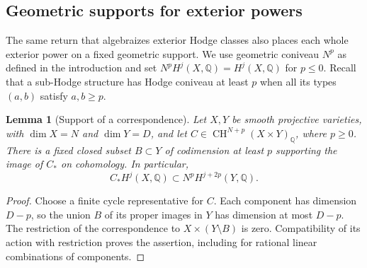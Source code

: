 \documentclass[11pt]{amsart}
\newcommand{\Q}{\mathbb Q}
\DeclareMathOperator{\CH}{CH}
\newtheorem{lemma}[theorem]{Lemma}
\theoremstyle{definition}
\theoremstyle{remark}
\numberwithin{equation}{section}
\begin{document}
\subsection{Geometric supports for exterior powers}
\label{ghc:subsec:exterior-coniveau}

The same return that algebraizes exterior Hodge classes also places
each whole exterior power on a fixed geometric support.  We use
geometric coniveau $N^p$ as defined in the introduction and set
$N^pH^j(X,\Q)=H^j(X,\Q)$ for $p\le0$.  Recall that a sub-Hodge
structure has Hodge coniveau at least $p$ when all its types $(a,b)$
satisfy $a,b\ge p$.

\begin{lemma}[Support of a correspondence]\label{ghc:lem:cycle-support}
Let $X,Y$ be smooth projective varieties, with $\dim X=N$ and
$\dim Y=D$, and let $C\in\CH^{N+p}(X\times Y)_\Q$, where $p\ge0$.
There is a fixed closed subset $B\subset Y$ of codimension at least
$p$ supporting the image of $C_*$ on cohomology.  In particular,
\[
 C_*H^j(X,\Q)\subset N^pH^{j+2p}(Y,\Q).
\]
\end{lemma}
\begin{proof}
Choose a finite cycle representative for $C$.  Each component has
dimension $D-p$, so the union $B$ of its proper images in $Y$ has
dimension at most $D-p$.  The restriction of the correspondence to
$X\times(Y\setminus B)$ is zero.  Compatibility of its action with
restriction proves the assertion, including for rational linear
combinations of components.
\end{proof}
\end{document}
